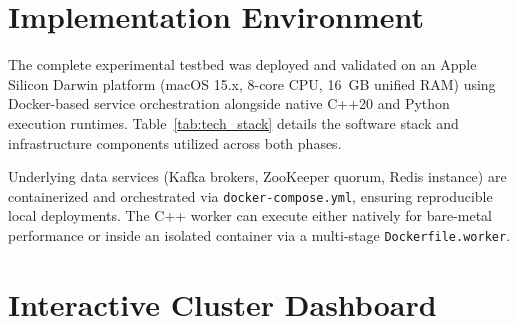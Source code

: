 \section{Implementation Environment}

The complete experimental testbed was deployed and validated on an Apple Silicon Darwin platform (macOS 15.x, 8-core CPU, 16~GB unified RAM) using Docker-based service orchestration alongside native C++20 and Python execution runtimes. Table~\ref{tab:tech_stack} details the software stack and infrastructure components utilized across both phases.

\begin{table}[htbp]
\centering
{}
\caption{Software stack and experimental testbed specifications.}
\label{tab:tech_stack}
\end{table}

Underlying data services (Kafka brokers, ZooKeeper quorum, Redis instance) are containerized and orchestrated via \texttt{docker-compose.yml}, ensuring reproducible local deployments. The C++ worker can execute either natively for bare-metal performance or inside an isolated container via a multi-stage \texttt{Dockerfile.worker}.

\section{Interactive Cluster Dashboard}

